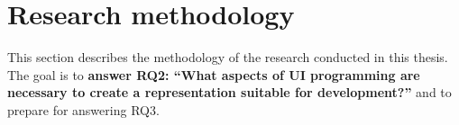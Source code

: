 \chapter{Research methodology}\label{ch:research-methodology}

This section describes the methodology of the research conducted in this thesis.
The goal is to \textbf{answer RQ2: \enquote{What aspects of UI programming are necessary to create a representation suitable for development?}} and to prepare for answering RQ3.





